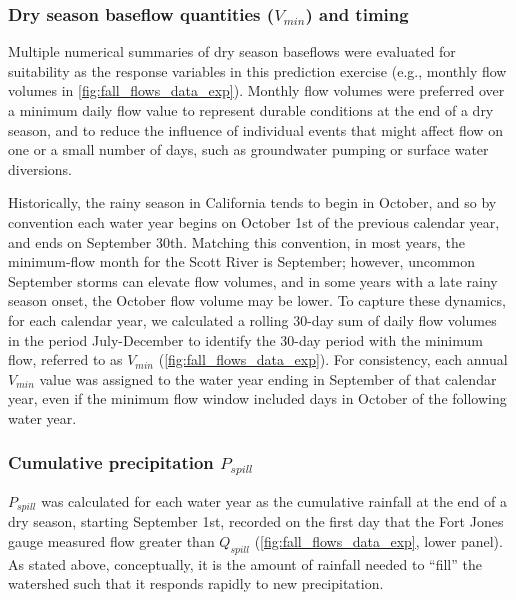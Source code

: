 \documentclass[
]{article}
\begin{document}
\hypertarget{dry-season-baseflow-quantities-v_min-and-timing}{%
\subsubsection{\texorpdfstring{Dry season baseflow quantities
(\(V_{min}\)) and
timing}{Dry season baseflow quantities (V\_\{min\}) and timing}}\label{dry-season-baseflow-quantities-v_min-and-timing}}

Multiple numerical summaries of dry season baseflows were evaluated for
suitability as the response variables in this prediction exercise (e.g.,
monthly flow volumes in \autoref{fig:fall_flows_data_exp}). Monthly flow
volumes were preferred over a minimum daily flow value to represent
durable conditions at the end of a dry season, and to reduce the
influence of individual events that might affect flow on one or a small
number of days, such as groundwater pumping or surface water diversions.

Historically, the rainy season in California tends to begin in October,
and so by convention each water year begins on October 1st of the
previous calendar year, and ends on September 30th. Matching this
convention, in most years, the minimum-flow month for the Scott River is
September; however, uncommon September storms can elevate flow volumes,
and in some years with a late rainy season onset, the October flow
volume may be lower. To capture these dynamics, for each calendar year,
we calculated a rolling 30-day sum of daily flow volumes in the period
July-December to identify the 30-day period with the minimum flow,
referred to as \(V_{min}\) (\autoref{fig:fall_flows_data_exp}). For
consistency, each annual \(V_{min}\) value was assigned to the water
year ending in September of that calendar year, even if the minimum flow
window included days in October of the following water year.

\hypertarget{cumulative-precipitation-p_spill}{%
\subsubsection{\texorpdfstring{Cumulative precipitation
\(P_{spill}\)}{Cumulative precipitation P\_\{spill\}}}\label{cumulative-precipitation-p_spill}}

\(P_{spill}\) was calculated for each water year as the cumulative
rainfall at the end of a dry season, starting September 1st, recorded on
the first day that the Fort Jones gauge measured flow greater than
\(Q_{spill}\) (\autoref{fig:fall_flows_data_exp}, lower panel). As
stated above, conceptually, it is the amount of rainfall needed to
``fill'' the watershed such that it responds rapidly to new
precipitation.
\end{document}
